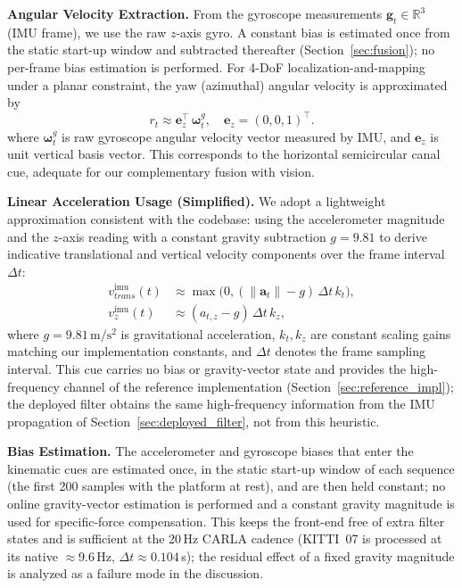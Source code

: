 \textbf{Angular Velocity Extraction.} From the gyroscope measurements $\mathbf{g}_t\in\mathbb{R}^3$ (IMU frame), we use the raw $z$-axis gyro. A constant bias is estimated once from the static start-up window and subtracted thereafter (Section~\ref{sec:fusion}); no per-frame bias estimation is performed. For 4-DoF lo\-cal\-i\-za\-tion-and-map\-ping under a planar constraint, the yaw (azimuthal) angular velocity is approximated by
\begin{equation}
    r_t \approx \mathbf{e}_z^\top\,\boldsymbol{\omega}_t^g,\quad \mathbf{e}_z=(0,0,1)^\top.
\end{equation}
where $\boldsymbol{\omega}_t^g$ is raw gyroscope angular velocity vector measured by IMU, and $\mathbf{e}_z$ is unit vertical basis vector.
This corresponds to the horizontal semicircular canal cue, adequate for our complementary fusion with vision.

\textbf{Linear Acceleration Usage (Simplified).} We adopt a lightweight approximation consistent with the codebase: using the accelerometer magnitude and the $z$-axis reading with a constant gravity subtraction $g\!=\!9.81$ to derive indicative translational and vertical velocity components over the frame interval $\Delta t$:
\begin{align}
    v^\mathrm{imu}_{trans}(t) & \approx \max\big(0, (\lVert\mathbf{a}_t\rVert - g)\,\Delta t\,k_t\big), \\
    v^\mathrm{imu}_{z}(t)     & \approx (a_{t,z} - g)\,\Delta t\,k_z,
\end{align}
where $g=9.81\,\mathrm{m/s^2}$ is gravitational acceleration, $k_t, k_z$ are constant scaling gains matching our implementation constants, and $\Delta t$ denotes the frame sampling interval. This cue carries no bias or gravity-vector state and provides the high-frequency channel of the reference implementation (Section~\ref{sec:reference_impl}); the deployed filter obtains the same high-frequency information from the IMU propagation of Section~\ref{sec:deployed_filter}, not from this heuristic.

\textbf{Bias Estimation.} The accelerometer and gyroscope biases that enter the kinematic cues are estimated once, in the static start-up window of each sequence (the first 200 samples with the platform at rest), and are then held constant; no online gravity-vector estimation is performed and a constant gravity magnitude is used for specific-force compensation. This keeps the front-end free of extra filter states and is sufficient at the 20\,Hz CARLA cadence (KITTI~07 is processed at its native $\approx$9.6\,Hz, $\Delta t\approx0.104$\,s); the residual effect of a fixed gravity magnitude is analyzed as a failure mode in the discussion.

